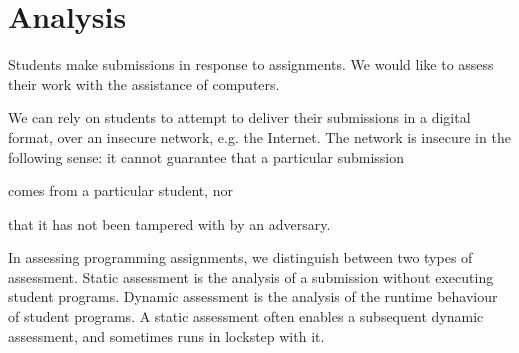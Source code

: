 
\chapter{Analysis}

Students make submissions in response to assignments. We would like to assess
their work with the assistance of computers.

We can rely on students to attempt to deliver their submissions in a digital
format, over an insecure network, e.g. the Internet. The network is insecure in
the following sense: it cannot guarantee that a particular submission
\begin{inparaenum}[(a)] \item comes from a particular student, nor \item that
it has not been tampered with by an adversary.\end{inparaenum}

In assessing programming assignments, we distinguish between two types of
assessment. Static assessment is the analysis of a submission without executing
student programs. Dynamic assessment is the analysis of the runtime behaviour
of student programs. A static assessment often enables a subsequent dynamic
assessment, and sometimes runs in lockstep with it.










